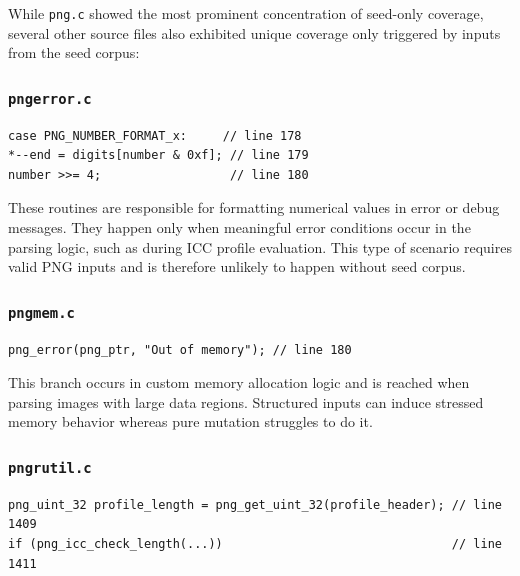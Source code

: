 \documentclass[11pt]{article}
\begin{document}
    While \texttt{png.c} showed the most prominent concentration of seed-only coverage, several other source files also exhibited unique coverage only triggered by inputs from the seed corpus:

    \subsubsection*{\texttt{pngerror.c}}
    \begin{lstlisting}
case PNG_NUMBER_FORMAT_x:     // line 178
*--end = digits[number & 0xf]; // line 179
number >>= 4;                  // line 180
    \end{lstlisting}

    These routines are responsible for formatting numerical values in error or debug messages. They happen only when meaningful error conditions occur in the parsing logic, such as during ICC profile evaluation. This type of scenario requires valid PNG inputs and is therefore unlikely to happen without seed corpus.

    \subsubsection*{\texttt{pngmem.c}}
    \begin{lstlisting}
png_error(png_ptr, "Out of memory"); // line 180
    \end{lstlisting}
    This branch occurs in custom memory allocation logic and is reached when parsing  images with large data regions. Structured inputs can induce stressed memory behavior whereas pure mutation struggles to do it.

    \subsubsection*{\texttt{pngrutil.c}}
    \begin{lstlisting}
png_uint_32 profile_length = png_get_uint_32(profile_header); // line 1409
if (png_icc_check_length(...))                                // line 1411
    \end{lstlisting}
\end{document}
